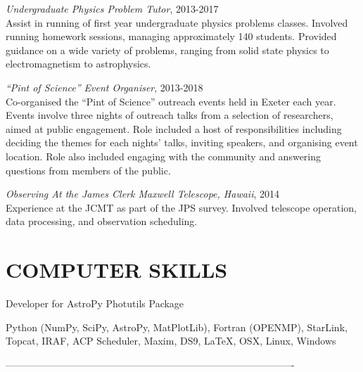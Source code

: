 \documentclass[letter, margin, 10pt]{res} %
\begin{document}
\begin{resume}
{\sl Undergraduate Physics Problem Tutor}, 2013-2017\\
Assist in running of first year undergraduate physics problems classes. Involved running homework sessions, managing approximately 140 students. Provided guidance on a wide variety of problems, ranging from solid state physics to electromagnetism to astrophysics. 

{\sl ``Pint of Science'' Event Organiser}, 2013-2018\\
Co-organised the ``Pint of Science'' outreach events held in Exeter each year. Events involve three nights of outreach talks from a selection of researchers, aimed at public engagement. Role included a host of responsibilities including deciding the themes for each nights' talks, inviting speakers, and organising event location. Role also included engaging with the community and answering questions from members of the public.

{\sl Observing At the James Clerk Maxwell Telescope, Hawaii}, 2014\\
Experience at the JCMT as part of the JPS survey. Involved telescope operation, data processing, and observation scheduling.


 

\section{COMPUTER SKILLS}

Developer for AstroPy Photutils Package

Python (NumPy, SciPy, AstroPy, MatPlotLib), Fortran (OPENMP), StarLink, Topcat, IRAF, ACP Scheduler, Maxim, DS9, \LaTeX, OSX, Linux, Windows






 
----------------------------------------------------------------------------------------

\end{resume}
\end{document}
